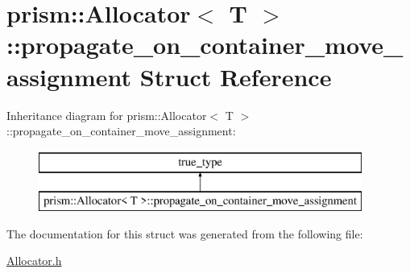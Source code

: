 \hypertarget{structprism_1_1_allocator_1_1propagate__on__container__move__assignment}{}\section{prism\+:\+:Allocator$<$ T $>$\+:\+:propagate\+\_\+on\+\_\+container\+\_\+move\+\_\+assignment Struct Reference}
\label{structprism_1_1_allocator_1_1propagate__on__container__move__assignment}
Inheritance diagram for prism\+:\+:Allocator$<$ T $>$\+:\+:propagate\+\_\+on\+\_\+container\+\_\+move\+\_\+assignment\+:\begin{figure}[H]
\begin{center}
\leavevmode
\includegraphics[height=2.000000cm]{structprism_1_1_allocator_1_1propagate__on__container__move__assignment}
\end{center}
\end{figure}


The documentation for this struct was generated from the following file\+:\begin{DoxyCompactItemize}
\item 
\hyperlink{_allocator_8h}{Allocator.\+h}\end{DoxyCompactItemize}
